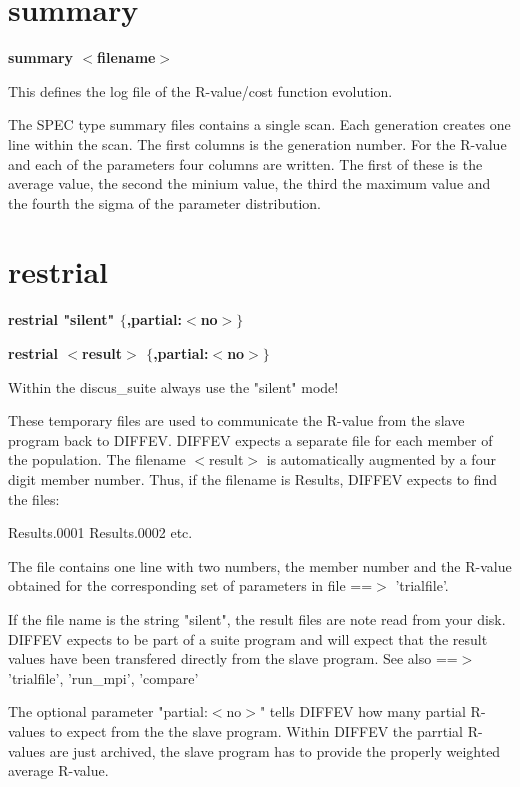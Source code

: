 \section{summary}
{\bf summary $ <$filename$> $ \par }
\par
\vspace{3pt}
This defines the log file of the R-value/cost function evolution. 
\par
The SPEC type summary files contains a single scan. Each generation 
creates one line within the scan. The first columns is the generation 
number. For the R-value and each of the parameters four columns are 
written. The first of these is the average value, the second the 
minium value, the third the maximum value and the fourth the sigma of 
the parameter distribution. 
\section{restrial}
{\bf restrial "silent" $ \{$,partial:$ <$no$> $$\} $ \par }
{\bf restrial $ <$result$> $ $ \{$,partial:$ <$no$> $$\} $ \par }
\par
\vspace{3pt}
Within the discus\_suite always use the "silent" mode! 
\par
These temporary files are used to communicate the R-value from the 
slave program back to DIFFEV. 
DIFFEV expects a separate file for each member of the population. 
The filename $ <$result$> $ is automatically augmented by a four digit 
member number. Thus, if the filename is Results, DIFFEV expects to 
find the files: 
\begin{MacVerbatim}
Results.0001
Results.0002
etc.
\end{MacVerbatim}
The file contains one line with two numbers, the member number and 
the R-value obtained for the corresponding set of parameters in 
file ==$> $ 'trialfile'. 
\par
If the file name is the string "silent", the result files are 
note read from your disk. DIFFEV expects to be part of a suite 
program and will expect that the result values have been transfered 
directly from the slave program. See also ==$> $ 'trialfile', 
'run\_mpi', 'compare' 
\par
The optional parameter "partial:$ <$no$> $" tells DIFFEV how many 
partial R-values to expect from the the slave program. 
Within DIFFEV the parrtial R-values are just archived, the slave 
program has to provide the properly weighted average R-value. 
\par
